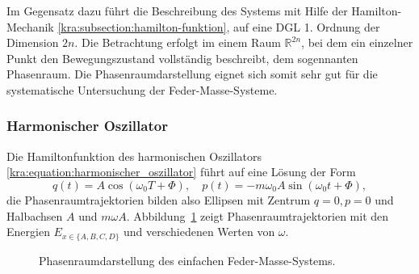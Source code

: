 Im Gegensatz dazu führt die Beschreibung des Systems mit Hilfe der Hamilton-Mechanik \ref{kra:subsection:hamilton-funktion}, auf eine DGL 1. Ordnung der Dimension $2n$.
Die Betrachtung erfolgt im einem Raum $\mathbb{R}^{2n}$, bei dem ein einzelner Punkt den Bewegungszustand vollständig beschreibt, dem sogennanten Phasenraum.
Die Phasenraumdarstellung eignet sich somit sehr gut für die systematische Untersuchung der Feder-Masse-Systeme.

\subsubsection{Harmonischer Oszillator}
Die Hamiltonfunktion des harmonischen Oszillators \eqref{kra:equation:harmonischer_oszillator} führt auf eine Lösung der Form
\begin{equation*}
    q(t) = A \cos(\omega_0 T + \Phi), \quad p(t) = -m \omega_0 A \sin(\omega_0 t + \Phi),
\end{equation*}
die Phasenraumtrajektorien bilden also Ellipsen mit Zentrum $q=0, p=0$ und Halbachsen $A$ und $m \omega A$.
Abbildung~\ref{kra:fig:phasenraum} zeigt Phasenraumtrajektorien mit den Energien $E_{x \in \{A, B, C, D\}}$ und verschiedenen Werten von $\omega$.
\begin{figure}
    \centering
    
    \caption{Phasenraumdarstellung des einfachen Feder-Masse-Systems.}
    \label{kra:fig:phasenraum}
\end{figure}

